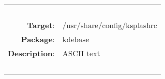 \begin{longtable}{rl}
\hline
\multicolumn{2}{l}{\ }\\
\textbf{Target}: & /usr/share/config/ksplashrc\\
\textbf{Package}: & kdebase\\
\textbf{Description}: & ASCII text\\
\multicolumn{2}{l}{\ }\\
\hline
\end{longtable}
